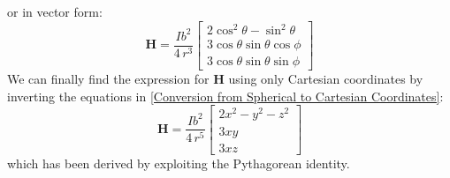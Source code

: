 or in vector form:
\[
\mathbf{H} = \frac{I b^2}{4 \, r^3} \begin{bmatrix}
2\cos^2\theta - \sin^2\theta \\
3\cos\theta \sin\theta \cos\phi \\
3\cos\theta \sin\theta \sin\phi
\end{bmatrix}
\]
We can finally find the expression for $\mathbf{H}$ using only Cartesian coordinates by inverting the equations in \ref{Conversion from Spherical to Cartesian Coordinates}:
\[
\mathbf{H} = \frac{I b^2}{4 \, r^5} \begin{bmatrix}
2x^2 - y^2 - z^2 \\
3xy \\
3xz
\end{bmatrix}
\]
which has been derived by exploiting the Pythagorean identity.








